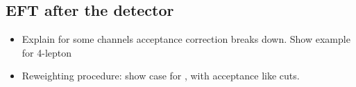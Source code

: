 \subsection{EFT after the detector}\label{sec:eft_acceptance_corrections}
\begin{itemize}
    \item Explain for some channels acceptance correction breaks down. Show example for 4-lepton
    \item Reweighting procedure: show case for \Hgg, with acceptance like cuts.
\end{itemize}
